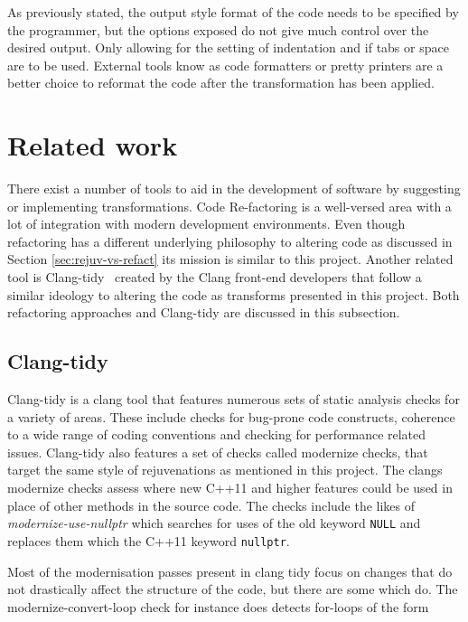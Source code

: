 \documentclass[bsc,frontabs,singlespacing,twoside,parskip,deptreport]{infthesis}
\begin{document}
As previously stated, the output style format of the code needs to be specified by the programmer, but the options exposed do not give much control over the desired output. Only allowing for the setting of indentation and if tabs or space are to be used. External tools know as code formatters or pretty printers  are a better choice to reformat the code after the transformation has been applied.

\section{Related work}
There exist a number of tools to aid in the development of software by suggesting or implementing transformations. Code Re-factoring \cite{REFACTOR} is a well-versed area with a lot of integration with modern development environments. Even though refactoring has a different underlying philosophy to altering code as discussed in Section \ref{sec:rejuv-vs-refact} its mission is similar to this project. Another related tool is Clang-tidy~\cite{CLANG_TIDY}  created by the Clang front-end developers that follow a similar ideology to altering the code as transforms presented in this project. Both refactoring approaches and Clang-tidy are discussed in this subsection.

\subsection{Clang-tidy}\label{sec:rw-clang-tidy}
Clang-tidy \cite{CLANG_TIDY} is a clang tool that features numerous sets of static analysis checks for a variety of areas. These include checks for bug-prone code constructs, coherence to a wide range of coding conventions and checking for performance related issues. Clang-tidy also features a set of checks called modernize checks, that target the same style of rejuvenations as mentioned in this project. The clangs modernize checks assess where new C++11 and higher features could be used in place of other methods in the source code. The checks include the likes of \textit{modernize-use-nullptr} which searches for uses of the old keyword \texttt{NULL} and replaces them which the C++11 keyword \texttt{nullptr}.

Most of the modernisation passes present in clang tidy focus on changes that do not drastically affect the structure of the code, but there are some which do. The modernize-convert-loop check \cite{FOR_CONVERT} for instance does detects for-loops of the form
\end{document}
